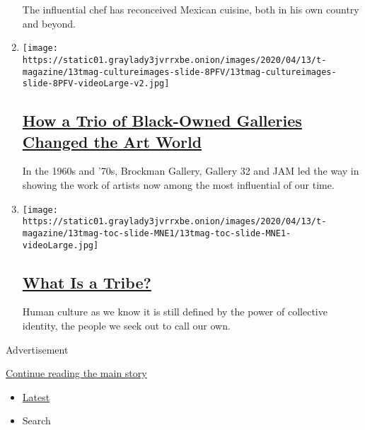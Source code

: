 \begin{enumerate}
  The influential chef has reconceived Mexican cuisine, both in his own
  country and beyond.
\item
  \texttt{[image: https://static01.graylady3jvrrxbe.onion/images/2020/04/13/t-magazine/13tmag-cultureimages-slide-8PFV/13tmag-cultureimages-slide-8PFV-videoLarge-v2.jpg]}

  \hypertarget{how-a-trio-of-black-owned-galleries-changed-the-art-world}{%
  \subsection{\texorpdfstring{\href{/interactive/2020/04/13/t-magazine/black-art-galleries.html}{How
  a Trio of Black-Owned Galleries Changed the Art
  World}}{How a Trio of Black-Owned Galleries Changed the Art World}}\label{how-a-trio-of-black-owned-galleries-changed-the-art-world}}

  In the 1960s and '70s, Brockman Gallery, Gallery 32 and JAM led the
  way in showing the work of artists now among the most influential of
  our time.
\item
  \texttt{[image: https://static01.graylady3jvrrxbe.onion/images/2020/04/13/t-magazine/13tmag-toc-slide-MNE1/13tmag-toc-slide-MNE1-videoLarge.jpg]}

  \hypertarget{what-is-a-tribe}{%
  \subsection{\texorpdfstring{\href{/interactive/2020/04/13/t-magazine/tribe-meaning.html}{What
  Is a Tribe?}}{What Is a Tribe?}}\label{what-is-a-tribe}}

  Human culture as we know it is still defined by the power of
  collective identity, the people we seek out to call our own.
\end{enumerate}

Advertisement

\protect\hyperlink{after-mid1}{Continue reading the main story}

\begin{itemize}
\tightlist
\item
  \protect\hyperlink{stream-panel}{Latest}
\item
  Search
\end{itemize}

